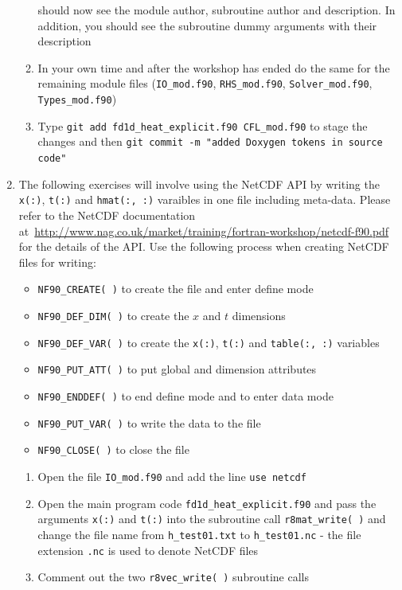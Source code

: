 \documentclass[12pt]{article}
\begin{document}
\begin{enumerate}
\begin{enumerate}
should now see the module author, subroutine author and description. In addition, you should see the subroutine
dummy arguments with their description
\item In your own time and after the workshop has ended do the same for the remaining module files 
(\texttt{IO\_mod.f90}, \texttt{RHS\_mod.f90}, \texttt{Solver\_mod.f90}, \texttt{Types\_mod.f90})
\item Type \texttt{git add fd1d\_heat\_explicit.f90 CFL\_mod.f90} to stage the changes and then 
\texttt{git commit -m "added Doxygen tokens in source code"}
\end{enumerate}
\item The following exercises will involve using the NetCDF API by writing the
  \texttt{x(:)}, \texttt{t(:)} and \texttt{hmat(:, :)} varaibles in one file including meta-data. 
Please refer to the NetCDF documentation at~\url{http://www.nag.co.uk/market/training/fortran-workshop/netcdf-f90.pdf} 
for the details of the API. Use the following process when creating NetCDF files for writing:
\begin{itemize}
\item\texttt{NF90\_CREATE( )} to create the file and enter define mode
\item\texttt{NF90\_DEF\_DIM( )} to create the $x$ and $t$ dimensions
\item\texttt{NF90\_DEF\_VAR( )} to create the \texttt{x(:)}, \texttt{t(:)} and
\texttt{table(:, :)} variables
\item\texttt{NF90\_PUT\_ATT( )} to put global and dimension attributes
\item\texttt{NF90\_ENDDEF( )} to end define mode and to enter data mode
\item\texttt{NF90\_PUT\_VAR( )} to write the data to the file
\item\texttt{NF90\_CLOSE( )} to close the file
\end{itemize}
\begin{enumerate}
\item Open the file \texttt{IO\_mod.f90} and add the line \texttt{use netcdf}
\item Open the main program code \texttt{fd1d\_heat\_explicit.f90} and pass the arguments \texttt{x(:)} and
  \texttt{t(:)} into the subroutine call \texttt{r8mat\_write( )} and change the file name from \texttt{h\_test01.txt}
  to \texttt{h\_test01.nc} - the file extension \texttt{.nc} is used to denote NetCDF files
\item Comment out the two \texttt{r8vec\_write( )} subroutine calls

\end{enumerate}
\end{enumerate}
\end{document}
